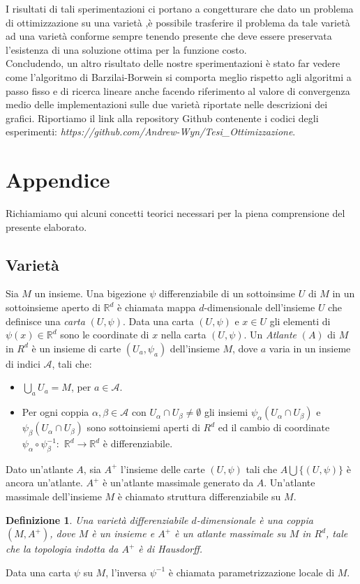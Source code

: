 \documentclass[a4paper, 12pt]{article}
\newtheorem{definition}{Definizione}
\begin{document}
I risultati di tali sperimentazioni ci portano a congetturare che dato un problema di ottimizzazione su una varietà ,è possibile trasferire il problema da tale varietà ad una varietà conforme sempre tenendo presente che deve essere preservata l'esistenza di una soluzione ottima per la funzione costo.\\
Concludendo, un altro risultato delle nostre sperimentazioni è stato far vedere come l'algoritmo di Barzilai-Borwein si comporta meglio rispetto agli algoritmi a passo fisso e di ricerca lineare anche facendo riferimento al valore di convergenza medio delle implementazioni sulle due varietà riportate nelle descrizioni dei grafici.
Riportiamo il link alla repository Github contenente i codici degli esperimenti: \textit{https://github.com/Andrew-Wyn/Tesi\_Ottimizzazione}.
\section{Appendice}
Richiamiamo qui alcuni concetti teorici necessari per la piena comprensione del presente elaborato.
\subsection{Varietà}
Sia $M$ un insieme. Una bigezione $\psi$ differenziabile di un sottoinsime $U$ di $M$ in un sottoinsieme aperto di $\mathbb{R}^d$ è chiamata mappa $d$-dimensionale dell'insieme $U$ che definisce una \textit{carta} $(U, \psi)$. Data una carta $(U, \psi)$ e $x \in U$ gli elementi di $\psi(x) \in \mathbb{R}^d$ sono le coordinate di $x$ nella carta $(U, \psi)$. Un \textit{Atlante} $(A)$ di $M$ in $R^d$ è un insieme di carte $(U_a, \psi_a)$ dell'insieme $M$, dove $a$ varia in un insieme di indici $\mathcal{A}$, tali che:
\begin{itemize}
    \item $\bigcup_a U_a = M$, per $a \in \mathcal{A}$.
    \item Per ogni coppia $\alpha, \beta \in \mathcal{A}$ con $U_{\alpha} \cap U_{\beta} \neq \emptyset$ gli insiemi $\psi_{\alpha}(U_{\alpha} \cap U_{\beta})$ e $\psi_{\beta}(U_{\alpha} \cap U_{\beta})$ sono sottoinsiemi aperti di $R^d$ ed il cambio di coordinate $\psi_{\alpha} \circ \psi_{\beta}^{-1}:$ $\mathbb{R}^d \to \mathbb{R}^d$ è differenziabile.
\end{itemize}
Dato un'atlante $A$, sia $A^+$ l'insieme delle carte $(U, \psi)$ tali che $A \bigcup \{(U, \psi)\}$ è ancora un'atlante. $A^+$ è un'atlante massimale generato da $A$. Un'atlante massimale dell'insieme $M$ è chiamato struttura differenziabile su $M$.
\begin{definition}
Una varietà differenziabile $d$-dimensionale è una coppia $(M, A^+)$, dove $M$ è un insieme e $A^+$ è un atlante massimale su $M$ in $R^d$, tale che la topologia indotta da $A^+$ è di Hausdorff.
\end{definition}
Data una carta $\psi$ su $M$, l'inversa $\psi^{-1}$ è chiamata parametrizzazione locale di $M$.
\end{document}

